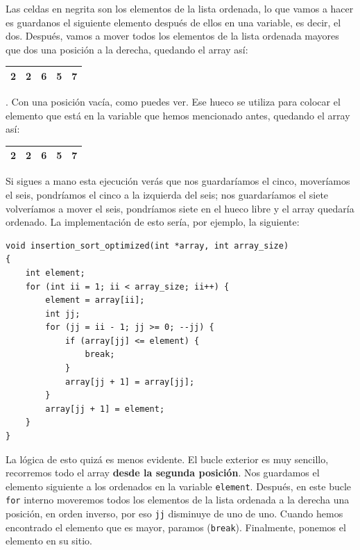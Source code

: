 \documentclass[a4paper]{article}
\begin{document}
Las celdas en negrita son los elementos de la lista ordenada, lo que vamos
a hacer es guardanos el siguiente elemento después de ellos en una variable,
es decir, el dos. Después, vamos a mover todos los elementos de la lista ordenada
mayores que dos una posición a la derecha, quedando el array así:
\begin{tabular}{|c|c|c|c|c|}
\hline
\textbf{2}&\color{white}2\normalcolor&\textbf{6}&5&7\\\hline
\end{tabular}.
Con una posición vacía, como puedes ver. Ese hueco se utiliza
para colocar el elemento que está en la variable que hemos mencionado antes,
quedando el array así:
\begin{tabular}{|c|c|c|c|c|}
\hline
\textbf{2}&\textbf{2}&\textbf{6}&5&7\\\hline
\end{tabular}
Si sigues a mano esta ejecución verás que nos guardaríamos el cinco, moveríamos
el seis, pondríamos el cinco a la izquierda del seis; nos guardaríamos el siete
volveríamos a mover el seis, pondríamos siete en el hueco libre y el array
quedaría ordenado. La implementación de esto sería, por ejemplo, la siguiente:

\noindent
\begin{minipage}[H]{\linewidth}
\mbox{}
\begin{lstlisting}[style=C, label={lst:insertionOptimized},
caption={Implementación alternativa de ordenación por inserción}]
void insertion_sort_optimized(int *array, int array_size)
{
    int element;
    for (int ii = 1; ii < array_size; ii++) {
        element = array[ii];
        int jj;
        for (jj = ii - 1; jj >= 0; --jj) {
            if (array[jj] <= element) {
                break;
            }
            array[jj + 1] = array[jj];
        }
        array[jj + 1] = element;
    }
}
\end{lstlisting}
\end{minipage}

La lógica de esto quizá es menos evidente. El bucle exterior es
muy sencillo, recorremos todo el array \textbf{desde la segunda posición}.
Nos guardamos el elemento siguiente a los ordenados en la variable
\verb!element!. Después, en este bucle \verb!for! interno moveremos todos los
elementos de la lista ordenada a la derecha una posición, en orden inverso,
por eso \verb!jj! disminuye de uno de uno. Cuando hemos encontrado el elemento
que es mayor, paramos (\verb!break!). Finalmente, ponemos el elemento en su
sitio.
\end{document}
